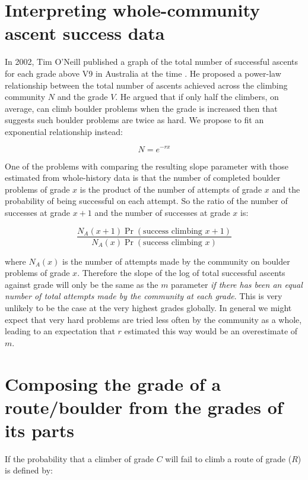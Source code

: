 \documentclass[11pt]{article}
\begin{document}
\section{Interpreting whole-community ascent success data}

In 2002, Tim O'Neill published a graph of the total number of successful ascents for each grade above V9 in Australia at the time \cite{oneill2002}. He proposed a power-law relationship between the total number of ascents achieved across the climbing community $N$ and the grade $V$. He argued that if only half the climbers, on average, can climb boulder problems when the grade is increased then that suggests such boulder problems are twice as hard. We propose to fit an exponential relationship instead:

\begin{equation}
N = e^{-rx} 
\end{equation}

One of the problems with comparing the resulting slope parameter with those estimated from whole-history data is that the number of completed boulder problems of grade $x$ is the product of the number of attempts of grade $x$ and the probability of being successful on each attempt. So the ratio of the number of successes at grade $x+1$ and the number of successes at grade $x$ is:

\begin{equation}
\frac{N_A(x+1)\Pr(\textrm{success climbing } x+1 )}{N_A(x)\Pr(\textrm{success climbing } x)}
\end{equation}

where $N_A(x)$ is the number of attempts made by the community on boulder problems of grade $x$. 
Therefore the slope of the log of total successful ascents against grade will only be the same as the $m$ parameter {\it if there has been an equal number of total attempts made by the community at each grade}. This is very unlikely to be the case at the very highest grades globally. In general we might expect that very hard problems are tried less often by the community as a whole, leading to an expectation that $r$ estimated this way would be an overestimate of $m$.


\section{Composing the grade of a route/boulder from the grades of its parts}

If the probability that a climber of grade $C$ will fail to climb a route of grade ($R$) is defined by:
\end{document}
